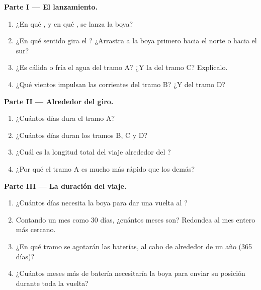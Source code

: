 \begin{problem}
\noindent\textbf{Parte I --- El lanzamiento.}\par\nopagebreak
\begin{enumerate}[beginpenalty=10000]
  \item ¿En qué , y en qué , se lanza la boya?
  \item ¿En qué sentido gira el ? ¿Arrastra a la boya primero hacia el
        norte o hacia el sur?
  \item ¿Es cálida o fría el agua del tramo A? ¿Y la del tramo C? Explícalo.
  \item ¿Qué vientos impulsan las corrientes del tramo B? ¿Y del tramo D?
\end{enumerate}

\noindent\textbf{Parte II --- Alrededor del giro.}\par\nopagebreak
\begin{enumerate}[resume, beginpenalty=10000]
  \item ¿Cuántos días dura el tramo A?
  \item ¿Cuántos días duran los tramos B, C y D?
  \item ¿Cuál es la longitud total del viaje alrededor del ?
  \item ¿Por qué el tramo A es mucho más rápido que los demás?
\end{enumerate}

\noindent\textbf{Parte III --- La duración del viaje.}\par\nopagebreak
\begin{enumerate}[resume, beginpenalty=10000]
  \item ¿Cuántos días necesita la boya para dar una vuelta al ?
  \item Contando un mes como 30 días, ¿cuántos meses son? Redondea al mes
        entero más cercano.
  \item ¿En qué tramo se agotarán las baterías, al cabo de alrededor de un
        año (365 días)?
  \item ¿Cuántos meses más de batería necesitaría la boya para enviar su
        posición durante toda la vuelta?
\end{enumerate}
\end{problem}
